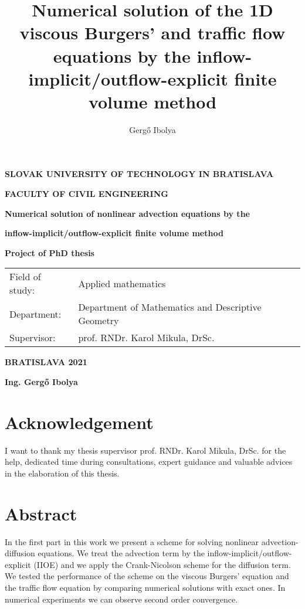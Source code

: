 \documentclass[a4paper,12pt]{report}%
\author{Gerg\H{o} Ibolya}
\title{Numerical solution of the 1D viscous Burgers' and traffic flow equations by the inflow-implicit/outflow-explicit finite volume method}
\begin{document}
	\setlength{\belowdisplayskip}{7pt} \setlength{\belowdisplayshortskip}{5pt} \setlength{\abovedisplayskip}{7pt}
\setlength{\abovedisplayshortskip}{5pt}

\thispagestyle{empty}
{
	\topmargin=0pt
	\centerline {\large \bf{SLOVAK UNIVERSITY OF TECHNOLOGY IN BRATISLAVA}}
	\vskip 0.2cm
	\centerline{\large \bf{FACULTY OF CIVIL ENGINEERING}}
	\vskip 5cm
	\centerline{\Large \bf{Numerical solution of nonlinear advection equations by the}}
	\vskip 0.2cm
	\centerline{\Large \bf{inflow-implicit/outflow-explicit finite volume method}}
	\vskip 0.5cm
	\centerline{\large \bf{Project of PhD thesis}}
	\vskip 5cm          %
	\normalsize
	\begin{tabular}[l]{p{}p{}}
		Field of study: & Applied mathematics\\
		Department: & Department of Mathematics and Descriptive Geometry\\
		Supervisor: & prof. RNDr. Karol Mikula, DrSc. \\
	\end{tabular}
	\vskip 3cm
	\centerline{\large \bf{BRATISLAVA 2021}}
	\vskip 0.2cm
	\centerline{\large \bf{Ing. Gerg\H{o} Ibolya}}
}
\pagebreak

\mbox{}
\vfill
\thispagestyle{empty}
\section*{Acknowledgement}
I want to thank my thesis supervisor prof. RNDr. Karol Mikula, DrSc. for the help, dedicated time during consultations, expert guidance and valuable advices in the elaboration of this thesis. %
\newpage


\thispagestyle{empty}
\mbox{}
\newpage

\section*{Abstract}
\thispagestyle{empty}
In the first part in this work we present a scheme for solving nonlinear advection-diffusion equations. We treat the advection term by the inflow-implicit/outflow-explicit (IIOE) and we apply the Crank-Nicolson scheme for the diffusion term. We tested the performance of the scheme on the viscous Burgers' equation and the traffic flow equation by comparing numerical solutions with exact ones. In numerical experiments we can observe second order convergence.
\end{document}
